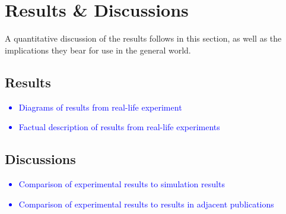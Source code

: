 \chapter{Results \& Discussions}

A quantitative discussion of the results follows in this section, as well as the implications they bear for use in the general world.

\section{Results}

\textcolor{blue}{
\begin{itemize}
    \item Diagrams of results from real-life experiment
    \item Factual description of results from real-life experiments
\end{itemize}
}

\section{Discussions}

\textcolor{blue}{
\begin{itemize}
    \item Comparison of experimental results to simulation results
    \item Comparison of experimental results to results in adjacent publications
\end{itemize}
}